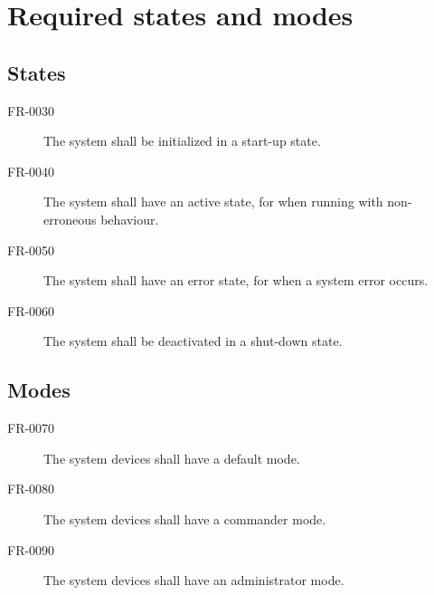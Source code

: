 \section{Required states and modes}

\subsection{States}
\begin{description}
  \item[FR-0030] The system shall be initialized in a start-up state.
  \item[FR-0040] The system shall have an active state, for when running with non-erroneous behaviour.
  \item[FR-0050] The system shall have an error state, for when a system error occurs.
  \item[FR-0060] The system shall be deactivated in a shut-down state.
\end{description}

\subsection{Modes}
\begin{description}
  \item[FR-0070] The system devices shall have a default mode.
  \item[FR-0080] The system devices shall have a commander mode.
  \item[FR-0090] The system devices shall have an administrator mode.
\end{description}